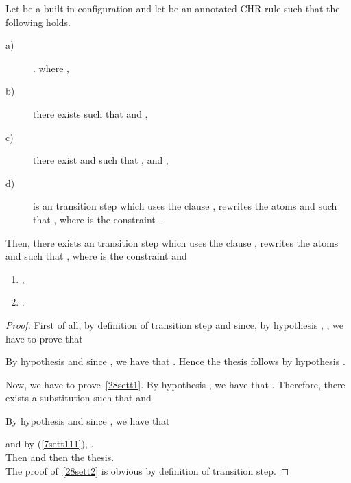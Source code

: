 \documentclass{tlp}
\begin{document}
\begin{proposition}\label{propcambioequality}
Let  be a built-in configuration and let  be an annotated CHR rule such that the following holds.\begin{description}
        \item[a)] . where
        ,
        \item[b)]
        there exists  such that
         and ,
        \item[c)] there exist  and  such that
        ,
         and ,
        \item[d)]  is an  transition step which uses the clause , rewrites the atoms  and such that
            , where  is the constraint
            .
      \end{description}
      Then, there exists an   transition step    which uses the clause , rewrites the atoms  and such that
      , where  is the constraint
             and
            \begin{enumerate}
              \item \label{28sett1} ,
              \item \label{28sett2} .
            \end{enumerate}
      \end{proposition}
\begin{proof}
First of all, by definition of   transition step and since, by hypothesis , , we have to prove that

         By hypothesis  and since , we have that
         . Hence the thesis follows by hypothesis .

        Now, we have to prove~\ref{28sett1}. By hypothesis ,  we have that
        .
        Therefore, there exists a substitution  such that  and

        By hypothesis  and since , we have that
        
         and by (\ref{7sett111}),
        .\\
        Then   and then the thesis.
        \\
        The proof of~\ref{28sett2} is obvious by definition of   transition step.
\end{proof}
\end{document}
